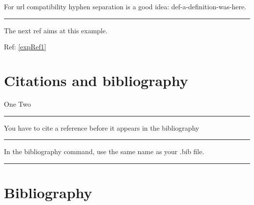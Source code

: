 \documentclass[12pt]{article}
\newcommand{\inOut}[1]{#1} %
\begin{document}
\begin{remark} \label{remLab2}
  For url compatibility hyphen separation is a good idea: def-a-definition-was-here.
\end{remark}\hrule

\begin{example} \label{expRef1}
	\inOut{
		The next ref aims at this example.
		
		Ref: \ref{expRef1}
	}
\end{example}

\section{Citations and bibliography}\label{secCit}

\begin{example} \label{expCite1}
\inOut{One \cite{LL00} Two \cite{LL01}}
\end{example}\hrule

\begin{remark} \label{remCite1}
  You have to cite a reference before it appears in the bibliography
\end{remark}\hrule

\begin{remark} \label{remCite2}
  In the bibliography command, use the same name as your .bib file.
\end{remark}\hrule

\section{Bibliography}\label{secBib}
\newpage

\end{document}
